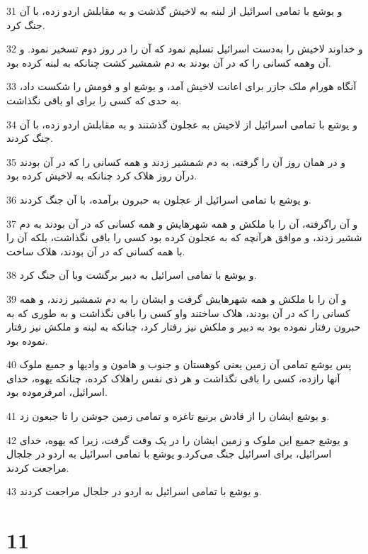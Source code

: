 \par 31 و یوشع با تمامی اسرائیل از لبنه به لاخیش گذشت و به مقابلش اردو زده، با آن جنگ کرد.
\par 32 و خداوند لاخیش را به‌دست اسرائیل تسلیم نمود که آن را در روز دوم تسخیر نمود. و آن وهمه کسانی را که در آن بودند به دم شمشیر کشت چنانکه به لبنه کرده بود.
\par 33 آنگاه هورام ملک جازر برای اعانت لاخیش آمد، و یوشع او و قومش را شکست داد، به حدی که کسی را برای او باقی نگذاشت.
\par 34 و یوشع با تمامی اسرائیل از لاخیش به عجلون گذشتند و به مقابلش اردو زده، با آن جنگ کردند.
\par 35 و در همان روز آن را گرفته، به دم شمشیر زدند و همه کسانی را که در آن بودند درآن روز هلاک کرد چنانکه به لاخیش کرده بود.
\par 36 و یوشع با تمامی اسرائیل از عجلون به حبرون برآمده، با آن جنگ کردند.
\par 37 و آن راگرفته، آن را با ملکش و همه شهرهایش و همه کسانی که در آن بودند به دم ششیر زدند، و موافق هر‌آنچه که به عجلون کرده بود کسی را باقی نگذاشت، بلکه آن را با همه کسانی که در آن بودند، هلاک ساخت.
\par 38 و یوشع با تمامی اسرائیل به دبیر برگشت وبا آن جنگ کرد.
\par 39 و آن را با ملکش و همه شهرهایش گرفت و ایشان را به دم شمشیر زدند، و همه کسانی را که در آن بودند، هلاک ساختند واو کسی را باقی نگذاشت و به طوری که به حبرون رفتار نموده بود به دبیر و ملکش نیز رفتار کرد، چنانکه به لبنه و ملکش نیز رفتار نموده بود.
\par 40 پس یوشع تمامی آن زمین یعنی کوهستان و جنوب و هامون و وادیها و جمیع ملوک آنها رازده، کسی را باقی نگذاشت و هر ذی نفس راهلاک کرده، چنانکه یهوه، خدای اسرائیل، امرفرموده بود.
\par 41 و یوشع ایشان را از قادش برنیع تاغزه و تمامی زمین جوشن را تا جبعون زد.
\par 42 و یوشع جمیع این ملوک و زمین ایشان را در یک وقت گرفت، زیرا که یهوه، خدای اسرائیل، برای اسرائیل جنگ می‌کرد.و یوشع با تمامی اسرائیل به اردو در جلجال مراجعت کردند.
\par 43 و یوشع با تمامی اسرائیل به اردو در جلجال مراجعت کردند.
 
\chapter{11}

